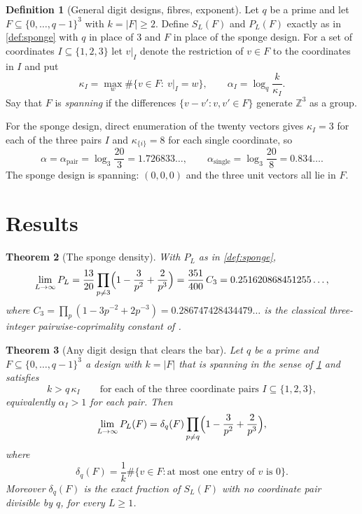 \documentclass[11pt]{amsart}
\newtheorem{theorem}{Theorem}[section]
\theoremstyle{definition}
\newtheorem{definition}[theorem]{Definition}
\theoremstyle{remark}
\begin{document}
\begin{definition}[General digit designs, fibres, exponent]
\label{def:general}
Let $q$ be a prime and let $F\subseteq\{0,\dots,q-1\}^3$ with $k=|F|\ge2$. Define $S_L(F)$ and $P_L(F)$ exactly as in \cref{def:sponge} with $q$ in place of $3$ and $F$ in place of the sponge design. For a set of coordinates $I\subseteq\{1,2,3\}$ let $v|_I$ denote the restriction of $v\in F$ to the coordinates in $I$ and put
\[
\kappa_I=\max_{w}\#\{v\in F:\ v|_I=w\},
\qquad
\alpha_I=\log_q\frac{k}{\kappa_I}.
\]
Say that $F$ is \emph{spanning} if the differences $\{v-v':v,v'\in F\}$ generate $\mathbb Z^3$ as a group.
\end{definition}

For the sponge design, direct enumeration of the twenty vectors gives $\kappa_I=3$ for each of the three pairs $I$ and $\kappa_{\{i\}}=8$ for each single coordinate, so
\[
\alpha=\alpha_{\text{pair}}=\log_3\frac{20}{3}=1.726833\ldots,
\qquad
\alpha_{\text{single}}=\log_3\frac{20}{8}=0.834\ldots.
\]
The sponge design is spanning: $(0,0,0)$ and the three unit vectors all lie in $F$.

\section{Results}
\label{sec:results}

\begin{theorem}[The sponge density]
\label{thm:sponge}
With $P_L$ as in \cref{def:sponge},
\[
\lim_{L\to\infty}P_L
=\frac{13}{20}\prod_{p\ne3}\Bigl(1-\frac{3}{p^2}+\frac{2}{p^3}\Bigr)
=\frac{351}{400}\,C_3
=0.251620868451255\ldots,
\]
where $C_3=\prod_p(1-3p^{-2}+2p^{-3})=0.286747428434479\ldots$ is the classical three-integer pairwise-coprimality constant of \emph{\cite{toth,oeisA065473}}.
\end{theorem}

\begin{theorem}[Any digit design that clears the bar]
\label{thm:general}
Let $q$ be a prime and $F\subseteq\{0,\dots,q-1\}^3$ a design with $k=|F|$ that is spanning in the sense of \cref{def:general} and satisfies
\[
k>q\,\kappa_I\qquad\text{for each of the three coordinate pairs } I\subseteq\{1,2,3\},
\]
equivalently $\alpha_I>1$ for each pair. Then
\[
\lim_{L\to\infty}P_L(F)
=\delta_q(F)\prod_{p\ne q}\Bigl(1-\frac{3}{p^2}+\frac{2}{p^3}\Bigr),
\]
where
\[
\delta_q(F)=\frac{1}{k}\#\{v\in F:\text{at most one entry of }v\text{ is }0\}.
\]
Moreover $\delta_q(F)$ is the exact fraction of $S_L(F)$ with no coordinate pair divisible by $q$, for every $L\ge1$.
\end{theorem}
\end{document}
